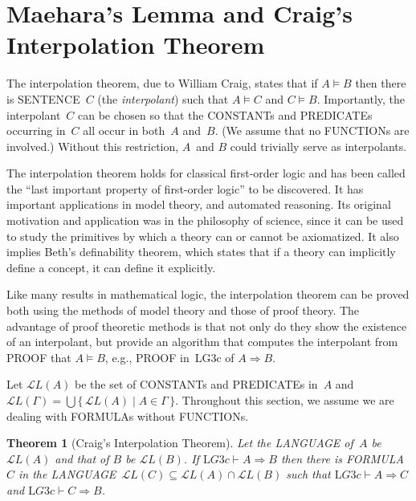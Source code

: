 \documentclass[10pt,a4paper]{article}
\newcommand*{\olup}[1]{\MakeUppercase{#1}}
\theoremstyle{plain}
\newtheorem{thm}{Theorem}[section]
\theoremstyle{definition}
\theoremstyle{remark}
\newcommand*{\olfileid}[3]{}
\newcommand*{\olsection}[1]{\section*{#1}}
\newcommand*{\olimport}[1]{}
\newcommand*{\ollabel}[1]{\label{#1}}
\providecommand{\Sequent}{\mathrel{\Rightarrow}}
\providecommand{\Proves}{\mathrel{\vdash}}
\providecommand{\Entails}{\mathrel{\models}}
\providecommand{\Lang}{\ensuremath{\mathcal{L}}}
\providecommand{\Log}{\ensuremath{\mathrm{L}}}
\providecommand{\Setabs}[2]{\{\, #1 \mid #2 \,\}}
\begin{document}
\olimport{introduction}
\olimport{ce-topmost}
\olimport{ce-largest}
\olimport{midsequent}
\olimport{interpolation}

\OLEndChapterHook





\olfileid{pt}{cut}{itp}

\olsection{Maehara's Lemma and Craig's Interpolation Theorem}

The interpolation theorem, due to William Craig, states that if $A
\Entails B$ then there is \olup{sentence}~$C$ (the \emph{interpolant})
such that $A \Entails C$ and $C \Entails B$. Importantly, the
interpolant~$C$ can be chosen so that the \olup{constant}s and
\olup{predicate}s occurring in~$C$ all occur in both~$A$ and~$B$. (We
assume that no \olup{function}s are involved.) Without this restriction,
$A$~and $B$ could trivially serve as interpolants.

The interpolation theorem holds for classical first-order logic and
has been called the ``last important property of first-order logic''
to be discovered. It has important applications in model theory, and
automated reasoning. Its original motivation and application was in
the philosophy of science, since it can be used to study the
primitives by which a theory can or cannot be axiomatized. It also
implies Beth's definability theorem, which states that if a theory can
implicitly define a concept, it can define it explicitly.

Like many results in mathematical logic, the interpolation theorem can
be proved both using the methods of model theory and those of proof
theory. The advantage of proof theoretic methods is that not only do
they show the existence of an interpolant, but provide an algorithm
that computes the interpolant from \olup{proof} that $A \Entails B$,
e.g., \olup{proof} in~\Log{G3c} of $A \Sequent B$.

Let $\Lang L(A)$ be the set of \olup{constant}s and \olup{predicate}s
in~$A$ and $\Lang L(\Gamma) = \bigcup \Setabs{\Lang L(A)}{A \in
\Gamma}$. Throughout this section, we assume we are dealing with
\olup{formula}s without \olup{function}s.

\begin{thm}[Craig's Interpolation Theorem]\ollabel{thm:interpolation}
Let the \olup{language} of~$A$ be $\Lang L(A)$ and that of $B$ be
$\Lang L(B)$. If $\Log{G3c} \Proves A \Sequent B$ then there is
\olup{formula}~$C$ in the \olup{language}~$\Lang L(C) \subseteq \Lang
L(A) \cap \Lang L(B)$ such that $\Log{G3c} \Proves A \Sequent C$
and $\Log{G3c} \Proves C \Sequent B$.
\end{thm}
\end{document}
